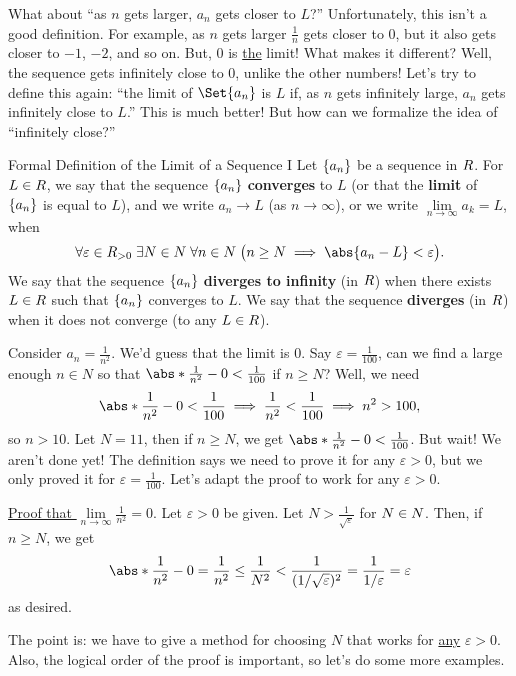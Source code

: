 What about ``as $ n $ gets larger, $ a_n $ gets closer to $ L $?'' Unfortunately, this isn't a good definition. For example, as $ n $
gets larger $ \frac{1}{n} $ gets closer to $ 0 $, but it also gets closer to $ -1 $, $ -2 $, and so on. But, $ 0 $
is \underline{the} limit! What makes it different? Well, the sequence gets infinitely close to $ 0 $,
unlike the other numbers! Let's try to define this again: ``the limit of $ \Set{a_n} $ is $ L $
if, as $ n $ gets infinitely large, $ a_n $ gets infinitely close to $ L $.'' This is much better!
But how can we formalize the idea of ``infinitely close?''
\begin{Definition}{Formal Definition of the Limit of a Sequence I}{}
    Let $ \{a_n\} $ be a sequence in $ \relax{R} $. For $ L\in\relax{R} $, we say that the sequence $ \{a_n\} $ \textbf{converges} to $ L $
    (or that the \textbf{limit} of $ \{a_n\} $ is equal to $ L $), and we write $ a_n\to L $ (as $ n\to\infty $), or we write
    $ \lim\limits_{{n} \to {\infty}}a_k=L $, when
    \[ \forall \varepsilon\in\R_{>0}\; \exists N\in \N\; \forall n\in\N\;\bigl(n\ge N\implies \abs{a_n-L}<\varepsilon\bigr). \]
    We say that the sequence $ \{a_n\} $ \textbf{diverges to infinity}
    (in $ \relax{R} $) when there exists $ L\in \relax{R} $ such that $ \{a_n\} $ converges to $ L $.
    We say that the sequence \textbf{diverges} (in $ \relax{R} $) when it does not converge (to any $ L\in\relax{R} $).
\end{Definition}
\begin{Example}{}{}
    Consider $ a_n=\frac{1}{n^2} $. We'd guess that the limit is $ 0 $. Say $ \varepsilon=\frac{1}{100} $, can we find a large enough $ n\in N $
    so that $ \abs*{\frac{1}{n^2}-0}<\frac{1}{100}  $ if $ n\ge N $? Well, we need
    \[ \abs*{\frac{1}{n^2}-0}<\frac{1}{100}\implies \frac{1}{n^2}<\frac{1}{100}\implies n^2>100, \]
    so $ n>10 $. Let $ N=11 $, then if $ n\ge N $, we get
    $ \abs*{\frac{1}{n^2}-0}<\frac{1}{100} $. But wait! We aren't done yet! The definition says we need to prove it for any $ \varepsilon>0 $,
    but we only proved it for $ \varepsilon=\frac{1}{100} $. Let's adapt the proof to work for any $ \varepsilon>0 $.
\end{Example}
\underline{Proof that $ \lim\limits_{{n} \to {\infty}}\frac{1}{n^2}=0 $}.
Let $ \varepsilon>0 $ be given. Let $ N>\frac{1}{\sqrt{\varepsilon}} $ for $ N\in \relax{N} $. Then, if $ n\ge N $,
we get
\[ \abs*{\frac{1}{n^2}-0}=\frac{1}{n^2}\le \frac{1}{N^2}<\frac{1}{(1/\sqrt{\varepsilon})^2}=\frac{1}{1/\varepsilon}=\varepsilon \]
as desired.

The point is: we have to give a method for choosing $ N $ that works for \underline{any} $ \varepsilon>0 $. Also, the logical order of the
proof is important, so let's do some more examples.

